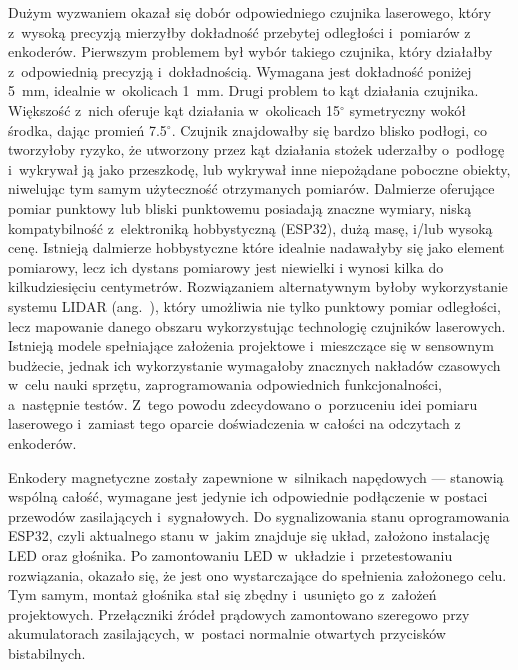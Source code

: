 Dużym wyzwaniem okazał się dobór odpowiedniego czujnika laserowego, który z~wysoką precyzją mierzyłby dokładność przebytej odległości i~pomiarów z enkoderów. Pierwszym problemem był wybór takiego czujnika, który działałby z~odpowiednią precyzją i~dokładnością. Wymagana jest dokładność poniżej 5~mm, idealnie w~okolicach 1~mm. Drugi problem to kąt działania czujnika. Większość z~nich oferuje kąt działania w~okolicach 15$^{\circ}$ symetryczny wokół środka, dając promień 7.5$^{\circ}$. Czujnik znajdowałby się bardzo blisko podłogi, co tworzyłoby ryzyko, że utworzony przez kąt działania stożek uderzałby o~podłogę i~wykrywał ją jako przeszkodę, lub wykrywał inne niepożądane poboczne obiekty, niwelując tym samym użyteczność otrzymanych pomiarów. Dalmierze oferujące pomiar punktowy lub bliski punktowemu posiadają znaczne wymiary, niską kompatybilność z~elektroniką hobbystyczną (ESP32), dużą masę, i/lub wysoką cenę. Istnieją dalmierze hobbystyczne które idealnie nadawałyby się jako element pomiarowy, lecz ich dystans pomiarowy jest niewielki i wynosi kilka do kilkudziesięciu centymetrów. Rozwiązaniem alternatywnym byłoby wykorzystanie systemu LIDAR (ang.~), który umożliwia nie tylko punktowy pomiar odległości, lecz mapowanie danego obszaru wykorzystując technologię czujników laserowych. Istnieją modele spełniające założenia projektowe i~mieszczące się w sensownym budżecie, jednak ich wykorzystanie wymagałoby znacznych nakładów czasowych w~celu nauki sprzętu, zaprogramowania odpowiednich funkcjonalności, a~następnie testów. Z~tego powodu zdecydowano o~porzuceniu idei pomiaru laserowego i~zamiast tego oparcie doświadczenia w całości na odczytach z enkoderów.

Enkodery magnetyczne zostały zapewnione w~silnikach napędowych --- stanowią wspólną całość, wymagane jest jedynie ich odpowiednie podłączenie w postaci przewodów zasilających i~sygnałowych. Do sygnalizowania stanu oprogramowania ESP32, czyli aktualnego stanu w~jakim znajduje się układ, założono instalację LED oraz głośnika. Po zamontowaniu LED w~układzie i~przetestowaniu rozwiązania, okazało się, że jest ono wystarczające do spełnienia założonego celu. Tym samym, montaż głośnika stał się zbędny i~usunięto go z~założeń projektowych. Przełączniki źródeł prądowych zamontowano szeregowo przy akumulatorach zasilających, w~postaci normalnie otwartych przycisków bistabilnych.

